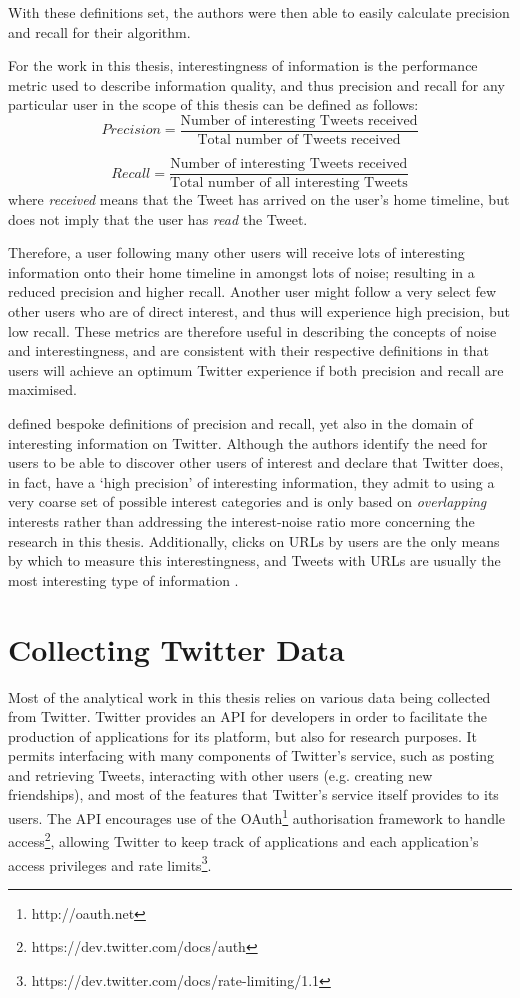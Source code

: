 With these definitions set, the authors were then able to easily calculate precision and recall for their algorithm.

For the work in this thesis, interestingness of information is the performance metric used to describe information quality, and thus precision and recall for any particular user in the scope of this thesis can be defined as follows:
\[
	Precision = \frac{\text{Number of interesting Tweets received}}{\text{Total number of Tweets received}}
\]

\[
	Recall = \frac{\text{Number of interesting Tweets received}}{\text{Total number of all interesting Tweets}}
\]
where \textit{received} means that the Tweet has arrived on the user's home timeline, but does not imply that the user has \textit{read} the Tweet.

Therefore, a user following many other users will receive lots of interesting information onto their home timeline in amongst lots of noise; resulting in a reduced precision and higher recall. Another user might follow a very select few other users who are of direct interest, and thus will experience high precision, but low recall. These metrics are therefore useful in describing the concepts of noise and interestingness, and are consistent with their respective definitions in that users will achieve an optimum Twitter experience if both precision and recall are maximised.

\citet{zadeh13} defined bespoke definitions of precision and recall, yet also in the domain of interesting information on Twitter. Although the authors identify the need for users to be able to discover other users of interest and declare that Twitter does, in fact, have a `high precision' of interesting information, they admit to using a very coarse set of possible interest categories and is only based on \textit{overlapping} interests rather than addressing the interest-noise ratio more concerning the research in this thesis. Additionally, clicks on URLs by users are the only means by which to measure this interestingness, and Tweets with URLs are usually the most interesting type of information \cite{alonso10}.



\section{Collecting Twitter Data}
Most of the analytical work in this thesis relies on various data being collected from Twitter. Twitter provides an API for developers in order to facilitate the production of applications for its platform, but also for research purposes. It permits interfacing with many components of Twitter's service, such as posting and retrieving Tweets, interacting with other users (e.g. creating new friendships), and most of the features that Twitter's service itself provides to its users. The API encourages use of the OAuth\footnote{http://oauth.net} authorisation framework to handle access\footnote{https://dev.twitter.com/docs/auth}, allowing Twitter to keep track of applications and each application's access privileges and rate limits\footnote{https://dev.twitter.com/docs/rate-limiting/1.1}.

